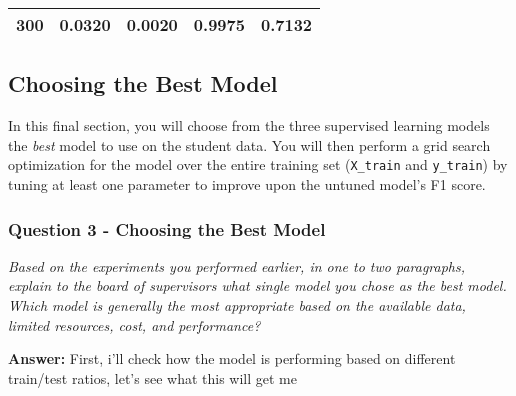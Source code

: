 \documentclass[11pt]{article}
\begin{document}
\begin{longtable}[]{@{}ccccc@{}}
\begin{minipage}[t]{0.16\columnwidth}\centering\strut
300\strut
\end{minipage} & \begin{minipage}[t]{0.21\columnwidth}\centering\strut
0.0320\strut
\end{minipage} & \begin{minipage}[t]{0.20\columnwidth}\centering\strut
0.0020\strut
\end{minipage} & \begin{minipage}[t]{0.15\columnwidth}\centering\strut
0.9975\strut
\end{minipage} & \begin{minipage}[t]{0.14\columnwidth}\centering\strut
0.7132\strut
\end{minipage}\tabularnewline
\bottomrule
\end{longtable}

    \subsection{Choosing the Best Model}\label{choosing-the-best-model}

In this final section, you will choose from the three supervised
learning models the \emph{best} model to use on the student data. You
will then perform a grid search optimization for the model over the
entire training set (\texttt{X\_train} and \texttt{y\_train}) by tuning
at least one parameter to improve upon the untuned model's F1 score.

    \subsubsection{Question 3 - Choosing the Best
Model}\label{question-3---choosing-the-best-model}

\emph{Based on the experiments you performed earlier, in one to two
paragraphs, explain to the board of supervisors what single model you
chose as the best model. Which model is generally the most appropriate
based on the available data, limited resources, cost, and performance?}

    \textbf{Answer: } First, i'll check how the model is performing based on
different train/test ratios, let's see what this will get me
\end{document}

